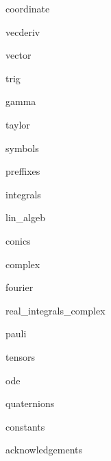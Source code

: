 \documentclass[8pt,a4paper,fleqn]{extarticle} %
\begin{document}
\begin{multicols}{3}
\raggedright %

{coordinate}

{vecderiv}

{vector}

{trig}

{gamma}

{taylor}

{symbols}

{preffixes}

{integrals}

\scriptsize{} 

{lin_algeb}

{conics}

{complex}

{fourier}

{real_integrals_complex}

{pauli}

{tensors}

{ode}

{quaternions}

{constants}


{acknowledgements}

\end{multicols}
\end{document}
